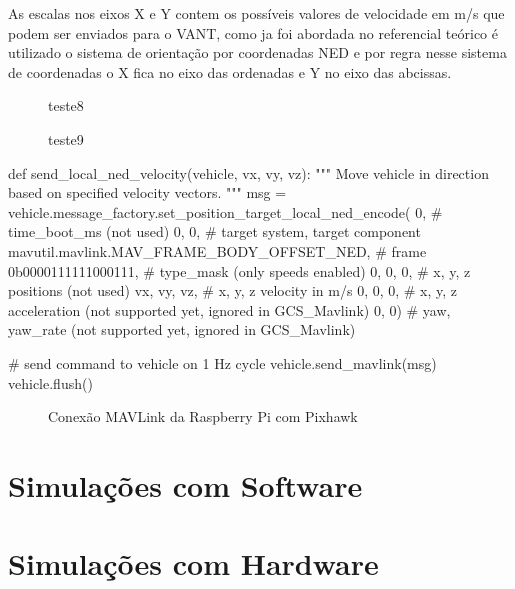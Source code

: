 As escalas nos eixos X e Y contem os possíveis valores de velocidade em m/s que podem ser enviados para o VANT, como ja foi abordada no referencial teórico é utilizado o sistema de orientação por coordenadas NED e por regra nesse sistema de coordenadas o X fica no eixo das ordenadas e Y no eixo das abcissas.
 

\begin{figure}[H]
	\centering
	\caption{teste8}
	
	\label{fig:teste8}
\end{figure}

\begin{figure}[H]
	\centering
	\caption{teste9}
	
	\label{fig:teste9}
\end{figure}

\begin{python_}
def send_local_ned_velocity(vehicle, vx, vy, vz):
	"""
	Move vehicle in direction based on specified velocity vectors.
	"""
	msg = vehicle.message_factory.set_position_target_local_ned_encode(
		0,       # time_boot_ms (not used)
		0, 0,    # target system, target component
		mavutil.mavlink.MAV_FRAME_BODY_OFFSET_NED, # frame
		0b0000111111000111, # type_mask (only speeds enabled)
		0, 0, 0, # x, y, z positions (not used)
		vx, vy, vz, # x, y, z velocity in m/s
		0, 0, 0, # x, y, z acceleration (not supported yet, ignored in GCS_Mavlink)
		0, 0)    # yaw, yaw_rate (not supported yet, ignored in GCS_Mavlink)
	
	# send command to vehicle on 1 Hz cycle
	vehicle.send_mavlink(msg)
	vehicle.flush()
\end{python_}

\begin{figure}[htpb]
	\centering
	\caption{Conexão MAVLink da Raspberry Pi com Pixhawk}
	\fontsize{9pt}{12pt}\selectfont
	\color{black}
	\def\svgwidth{15cm}
	
	\label{fig:mavlink}
\end{figure}



\section{Simulações com Software}

\section{Simulações com Hardware}





